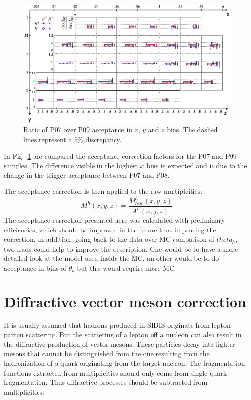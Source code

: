 \begin{figure}
  \centering
	\includegraphics[scale=0.7]{./gfx/SysAcc.png}
	\caption{Ratio of P$07$ over P$09$ acceptance in $x$, $y$ and $z$ bins. The dashed lines represent a $5$\% discrepancy.}
	\label{pic:AccPer}
\end{figure}

In Fig.~\ref{pic:AccPer} are compared the acceptance correction factors for the P$07$ and P$09$ samples. The difference visible in the highest $x$ bins is expected and is due to the change in the trigger acceptance between P$07$ and P$08$.

The acceptance correction is then applied to the raw multiplcities:
%
\begin{equation}
  M^h(x,y,z) = \frac{M^h_{raw}(x,y,z)}{A^h(x,y,z)}
\end{equation}
%
The acceptance correction presented here was calculated with preliminary efficiencies, which should be improved in the future thus improving the correction. In addition, going back to the data over MC comparison of $theta_h$, two leads could help to improve the description. One would be to have a more detailed look at the model used inside the MC, an other would be to do acceptance in bins of $\theta_h$ but this would require more MC.

\section{Diffractive vector meson correction} \label{sec:DVMf}

It is usually assumed that hadrons produced in SIDIS originate from lepton-parton scattering. But the scattering of a lepton off a nucleon can also result in the diffractive production of vector mesons. These particles decay into lighter mesons that cannot be distinguished from the one resulting from the hadronization of a quark originating from the target nucleon. The fragmentation functions extracted from multiplicities should only come from single quark fragmentation. Thus diffractive processes should be subtracted from multiplicities.

